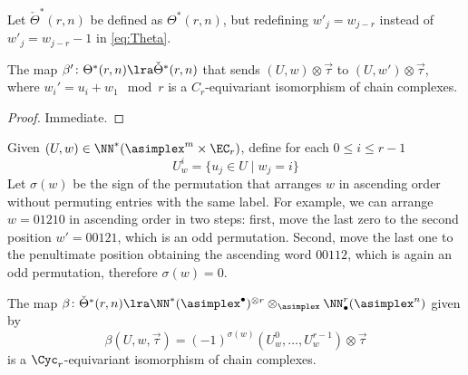 \begin{definition} Let $\check{\Theta}^*(r,n)$ be defined as $\Theta^*(r,n)$, but redefining $w'_j = w_{j-r}$ instead of $w'_j = w_{j-r}-1$ in \eqref{eq:Theta}.
\end{definition}
\begin{lemma}
	The map $\beta'\colon \Theta^*(r,n)\lra \check{\Theta}^*(r,n)$ that sends $(U,w)\otimes \vec{\tau}$ to $(U,w')\otimes \vec{\tau}$, where $w_i' = u_i+w_1\mod r$ is a $C_r$-equivariant isomorphism of chain complexes.
\end{lemma}
\begin{proof} Immediate.
\end{proof}
Given $(U,w)\in \NN^*(\asimplex^m\times \EC_r)$, define for each $0\leq i\leq r-1$
\[U_w^i = \{u_j\in U\mid w_j=i\}\]
Let $\sigma(w)$ be the sign of the permutation that arranges $w$ in ascending order without permuting entries with the same label. For example, we can arrange $w=01210$ in ascending order in two steps: first, move the last zero to the second position $w' = 00121$, which is an odd permutation. Second, move the last one to the penultimate position obtaining the ascending word $00112$, which is again an odd permutation, therefore $\sigma(w) = 0$.
\begin{lemma}
	The map $\beta\colon \check{\Theta}^*(r,n)\lra \NN^*(\asimplex^\bullet)^{\otimes r}\otimes_{\asimplex} \NN_\bullet^r(\asimplex^n)$ given by
	\[\beta(U,w,\vec{\tau}) = (-1)^{\sigma(w)}(U_w^0,\ldots, U_w^{r-1})\otimes \vec{\tau}\]
	is a $\Cyc_r$-equivariant isomorphism of chain complexes.
\end{lemma}
